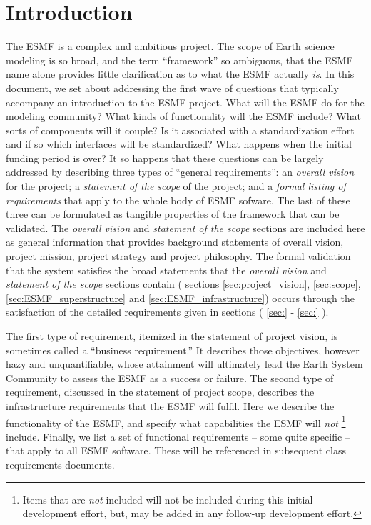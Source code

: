 \section{Introduction}
The ESMF is a complex and ambitious 
project.   The scope of Earth science modeling is so broad, and the 
term ``framework'' so ambiguous, that the ESMF name alone provides 
little clarification as to what the ESMF actually {\it is}.  In 
this document, we set about addressing the first wave of questions that 
typically accompany an introduction to the ESMF project.  What will the 
ESMF do for the modeling community?  What kinds of functionality will the ESMF 
include?  What sorts of components will it couple?  Is it associated with 
a standardization effort and if so which interfaces will be 
standardized?  What happens when the initial funding period is over?  
It so happens that these questions can be largely addressed by
describing three types of ``general requirements'': an {\it overall vision}
for the project; a {\it statement of the scope} of the project; and a {\it formal listing of requirements} that apply to the whole body of ESMF sofware.
The last of these three can be formulated as tangible properties of the 
framework that can be validated. The {\it overall vision} and {\it statement of 
the scope} sections are included here as general information that provides
background statements of overall vision, project mission, project strategy
and project philosophy. The formal validation that the system satisfies the
broad statements that the {\it overall vision} and {\it statement of the scope} 
sections contain ( sections \ref{sec:project_vision}, \ref{sec:scope}, \ref{sec:ESMF_superstructure} and \ref{sec:ESMF_infrastructure}) occurs through the 
satisfaction of the detailed requirements given in sections 
( \ref{sec:} - \ref{sec:} ).


The first type of requirement, itemized in the statement of project
vision, is sometimes called a ``business requirement.'' \cite{wiegers}
It describes those objectives, however hazy and unquantifiable, whose
attainment will ultimately lead the Earth System Community to assess
the ESMF as a success or failure.  The second type of requirement,
discussed in the statement of project scope, describes the
infrastructure requirements that the ESMF will fulfil.  Here we
describe the functionality of the ESMF, and specify what capabilities
the ESMF will {\it not} 
\footnote{ Items that are {\it not}
included will not be included during this initial development
effort, but, may be added in any follow-up
development effort.}
include.
Finally, we list a set of functional
requirements -- some quite specific -- that apply to all ESMF
software.  These will be referenced in subsequent class requirements
documents. 





